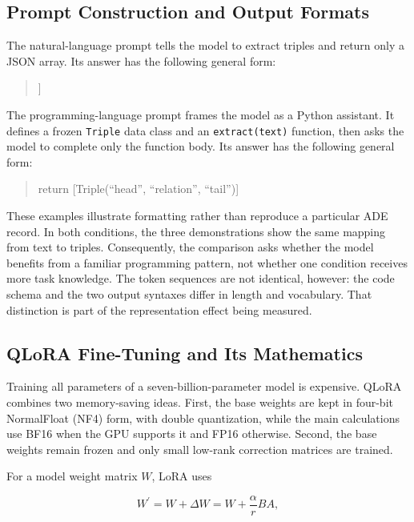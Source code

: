 \documentclass[11pt]{article}
\begin{document}
\subsection{Prompt Construction and Output Formats}
\label{prompt-construction-and-output-formats}

The natural-language prompt tells the model to extract triples and return
only a JSON array. Its answer has the following general form:

\begin{quote}
\small\ttfamily
[[``head'', ``relation'', ``tail'']]
\end{quote}

The programming-language prompt frames the model as a Python assistant.
It defines a frozen \texttt{Triple} data class and an
\texttt{extract(text)} function, then asks the model to complete only the
function body. Its answer has the following general form:

\begin{quote}
\small\ttfamily
return [Triple(``head'', ``relation'', ``tail'')]
\end{quote}

These examples illustrate formatting rather than reproduce a particular
ADE record. In both conditions, the three demonstrations show the same
mapping from text to triples. Consequently, the comparison asks whether
the model benefits from a familiar programming pattern, not whether one
condition receives more task knowledge. The token sequences are not
identical, however: the code schema and the two output syntaxes differ in
length and vocabulary. That distinction is part of the representation
effect being measured.

\subsection{QLoRA Fine-Tuning and Its Mathematics}
\label{qlora-fine-tuning-and-its-mathematics}

Training all parameters of a seven-billion-parameter model is expensive.
QLoRA combines two memory-saving ideas. First, the base weights are kept
in four-bit NormalFloat (NF4) form, with double quantization, while the
main calculations use BF16 when the GPU supports it and FP16 otherwise.
Second, the base weights remain frozen and only small low-rank correction
matrices are trained.

For a model weight matrix $W$, LoRA uses

\[
W^{\prime} = W + \Delta W
             = W + \frac{\alpha}{r}BA,
\]
\end{document}
